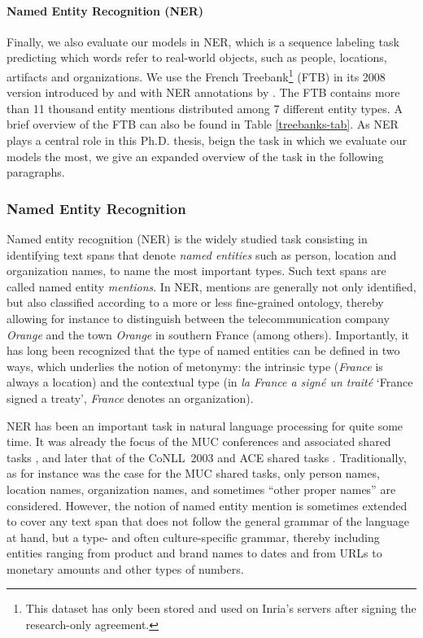 \paragraph{Named Entity Recognition (NER)} Finally, we also evaluate our models in NER, which is a sequence labeling task predicting which words refer to real-world objects, such as people, locations, artifacts and organizations. We use the French Treebank\footnote{This dataset has only been stored and used on Inria's servers after signing the research-only agreement.} (FTB) \citep{abeille-etal-2003-building} in its 2008 version introduced by \citet{candito-crabbe-2009-improving} and with NER annotations by \citet{sagot-etal-2012-annotation}. The FTB contains more than 11 thousand entity mentions distributed among 7 different entity types. A brief overview of the FTB can also be found in Table \ref{treebanks-tab}. As NER plays a central role in this Ph.D. thesis, beign the task in which we evaluate our models the most, we give an expanded overview of the task in the following paragraphs.

\subsubsection{Named Entity Recognition}

Named entity recognition (NER) is the widely studied task consisting in identifying text spans that denote \emph{named entities} such as person, location and organization names, to name the most important types. Such text spans are called named entity \emph{mentions}. In NER, mentions are generally not only identified, but also classified according to a more or less fine-grained ontology, thereby allowing for instance to distinguish between the telecommunication company \emph{Orange} and the town \emph{Orange} in southern France (among others). Importantly, it has long been recognized that the type of named entities can be defined in two ways, which underlies the notion of metonymy: the intrinsic type (\emph{France} is always a location) and the contextual type (in \emph{la France a signé un traité} `France signed a treaty', \emph{France} denotes an organization).

NER has been an important task in natural language processing for quite some time. It was already the focus of the MUC conferences and associated shared tasks \citep{marsh-perzanowski-1998-muc}, and later that of the CoNLL~2003 and ACE shared tasks \citep{tjong-kim-sang-de-meulder-2003-introduction,doddington-etal-2004-automatic}. Traditionally, as for instance was the case for the MUC shared tasks, only person names, location names, organization names, and sometimes ``other proper names'' are considered. However, the notion of named entity mention is sometimes extended to cover any text span that does not follow the general grammar of the language at hand, but a type- and often culture-specific grammar, thereby including entities ranging from product and brand names to dates and from URLs to monetary amounts and other types of numbers.

